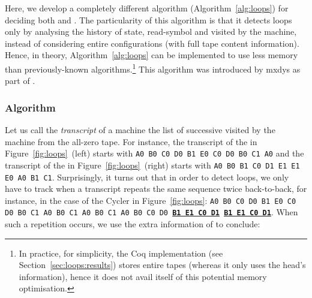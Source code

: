 Here, we develop a completely different algorithm (Algorithm~\ref{alg:loops}) for deciding both \cyclers and \TCs. The particularity of this algorithm is that it detects loops only by analysing the history of state, read-symbol and \headposs visited by the machine, instead of considering entire configurations (\ie with full tape content information). Hence, in theory, Algorithm~\ref{alg:loops} can be implemented to use less memory than previously-known algorithms.\footnote{In practice, for simplicity, the Coq implementation (see Section~\ref{sec:loops:results}) stores entire tapes (whereas it only uses the head's information), hence it does not avail itself of this potential memory optimisation.} This algorithm was introduced by mxdys as part of \CoqBB.

\subsubsection{Algorithm}\label{sec:loops:algo}





Let us call the \textit{transcript} of a machine the list of successive \ssps visited by the machine from the all-zero tape. For instance, the transcript of the \cycler in Figure~\ref{fig:loops}~(left) starts with \texttt{A0 B0 C0 D0 B1 E0 C0 D0 B0 C1 A0} and the transcript of the \TC in Figure~\ref{fig:loops}~(right) starts with \texttt{A0 B0 B1 C0 D1 E1 E1 E0 A0 B1 C1}. Surprisingly, it turns out that in order to detect loops, we only have to track when a transcript repeats the same sequence twice back-to-back, for instance, in the case of the Cycler in Figure~\ref{fig:loops}: \texttt{A0 B0 C0 D0 B1 E0 C0 D0 B0 C1 A0 B0 C1 A0 B0 C1 A0 B0 C0 D0 \textbf{\underline{B1 E1 C0 D1}} \textbf{\underline{B1 E1 C0 D1}}}. When such a repetition occurs, we use the extra information of \headpos to conclude:

